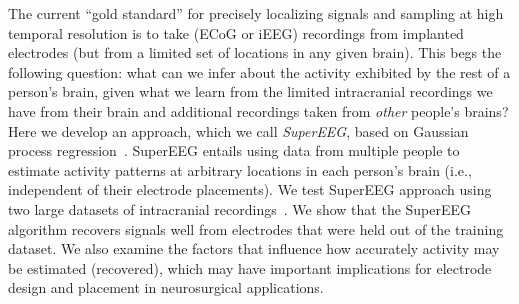 \documentclass[11pt]{article}
\begin{document}
The current ``gold standard'' for precisely localizing signals and
sampling at high temporal resolution is to take (ECoG or iEEG)
recordings from implanted electrodes (but from a limited set of
locations in any given brain).  This begs the following question: what
can we infer about the activity exhibited by the rest of a person's
brain, given what we learn from the limited intracranial recordings we
have from their brain and additional recordings taken from
\textit{other} people's brains?  Here we develop an approach, which we
call \textit{SuperEEG}, based on Gaussian process
regression~\cite{Rasm06}.  SuperEEG entails using data from multiple
people to estimate activity patterns at arbitrary locations in each
person's brain (i.e., independent of their electrode placements).  We
test SuperEEG approach using two large datasets of intracranial
recordings~\cite{SedeEtal03, SedeEtal07a, SedeEtal07b, MannEtal11,
  MannEtal12, EzzyEtal17, HoraEtal17, KragEtal17, KuceEtal17,
  LinEtal17, SoloEtal18, WeidEtal18, EzzyEtal18, KuceEtal18}.  We show
that the SuperEEG algorithm recovers signals well from electrodes that
were held out of the training dataset.  We also examine the factors
that influence how accurately activity may be estimated (recovered),
which may have important implications for electrode design and
placement in neurosurgical applications.
\end{document}
